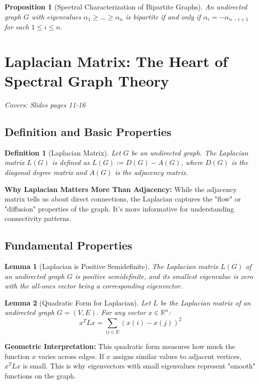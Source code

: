 \documentclass[11pt]{article}
\newtheorem{lemma}{Lemma}
\newtheorem{definition}{Definition}
\newtheorem{proposition}{Proposition}
\begin{document}
\begin{proposition}[Spectral Characterization of Bipartite Graphs]
An undirected graph $G$ with eigenvalues $\alpha_1 \geq \ldots \geq \alpha_n$ is bipartite if and only if $\alpha_i = -\alpha_{n-i+1}$ for each $1 \leq i \leq n$.
\end{proposition}

\section{Laplacian Matrix: The Heart of Spectral Graph Theory}
\textit{Covers: Slides pages 11-16}

\subsection{Definition and Basic Properties}

\begin{definition}[Laplacian Matrix]
Let $G$ be an undirected graph. The Laplacian matrix $L(G)$ is defined as $L(G) := D(G) - A(G)$, where $D(G)$ is the diagonal degree matrix and $A(G)$ is the adjacency matrix.
\end{definition}

\textbf{Why Laplacian Matters More Than Adjacency:} While the adjacency matrix tells us about direct connections, the Laplacian captures the "flow" or "diffusion" properties of the graph. It's more informative for understanding connectivity patterns.

\subsection{Fundamental Properties}

\begin{lemma}[Laplacian is Positive Semidefinite]
The Laplacian matrix $L(G)$ of an undirected graph $G$ is positive semidefinite, and its smallest eigenvalue is zero with the all-ones vector being a corresponding eigenvector.
\end{lemma}

\begin{lemma}[Quadratic Form for Laplacian]
Let $L$ be the Laplacian matrix of an undirected graph $G = (V,E)$. For any vector $x \in \mathbb{R}^n$:
$$x^T L x = \sum_{ij \in E} (x(i) - x(j))^2$$
\end{lemma}

\textbf{Geometric Interpretation:} This quadratic form measures how much the function $x$ varies across edges. If $x$ assigns similar values to adjacent vertices, $x^T L x$ is small. This is why eigenvectors with small eigenvalues represent "smooth" functions on the graph.
\end{document}
